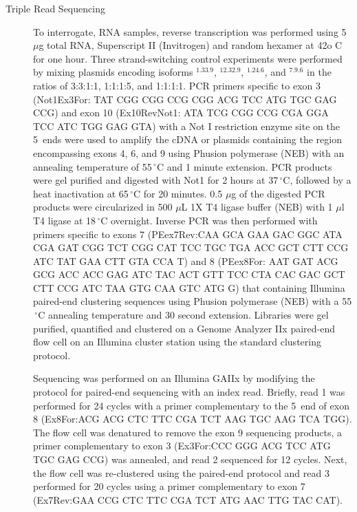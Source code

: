 \begin{description}
		\item[Triple Read Sequencing] 
		To interrogate, RNA samples, reverse transcription was performed using 5 $\mu$g total RNA, Superscript II (Invitrogen) and random hexamer at 42o C for one hour. Three strand-switching control experiments were performed by mixing plasmids encoding isoforms \dscam{}$^{1.33.9}$, \dscam{}$^{12.32.9}$, \dscam{}$^{1.24.6}$, and \dscam{}$^{7.9.6}$ in the ratios of 3:3:1:1, 1:1:1:5, and 1:1:1:1. PCR primers specific to exon 3 (Not1Ex3For: TAT CGG CGG CCG CGG ACG TCC ATG TGC GAG CCG) and exon 10 (Ex10RevNot1: ATA TCG CGG CCG CGA GGA TCC ATC TGG GAG GTA) with a Not I restriction enzyme site on the 5\textprime~ends were used to amplify the cDNA or plasmids containing the region encompassing exons 4, 6, and 9 using Phusion polymerase (NEB) with an annealing temperature of 55$\,^{\circ}\mathrm{C}$ and 1 minute extension. PCR products were gel purified and digested with Not1 for 2 hours at 37$\,^{\circ}\mathrm{C}$, followed by a heat inactivation at 65$\,^{\circ}\mathrm{C}$ for 20 minutes. 0.5 $\mu$g of the digested PCR products were circularized in 500 $\mu$L 1X T4 ligase buffer (NEB) with 1 $\mu$l T4 ligase at 18$\,^{\circ}\mathrm{C}$ overnight. Inverse PCR was then performed with primers specific to exons 7 (PEex7Rev:CAA GCA GAA GAC GGC ATA CGA GAT CGG TCT CGG CAT TCC TGC TGA ACC GCT CTT CCG ATC TAT GAA CTT GTA CCA T) and 8 (PEex8For: AAT GAT ACG GCG ACC ACC GAG ATC TAC ACT GTT TCC CTA CAC GAC GCT CTT CCG ATC TAA GTG CAA GTC ATG G) that containing Illumina paired-end clustering sequences using Phusion polymerase (NEB) with a 55$\,^{\circ}\mathrm{C}$ annealing temperature and 30 second extension. Libraries were gel purified, quantified and clustered on a Genome Analyzer IIx paired-end flow cell on an Illumina cluster station using the standard clustering protocol.

		Sequencing was performed on an Illumina GAIIx by modifying the protocol for paired-end sequencing with an index read. Briefly, read 1 was performed for 24 cycles with a primer complementary to the 5\textprime~end of exon 8 (Ex8For:ACG ACG CTC TTC CGA TCT AAG TGC AAG TCA TGG). The flow cell was denatured to remove the exon 9 sequencing products, a primer complementary to exon 3 (Ex3For:CCC GGG ACG TCC ATG TGC GAG CCG) was annealed, and read 2 sequenced for 12 cycles. Next, the flow cell was re-clustered using the paired-end protocol and read 3 performed for 20 cycles using a primer complementary to exon 7 (Ex7Rev:GAA CCG CTC TTC CGA TCT ATG AAC TTG TAC CAT).


\end{description}

